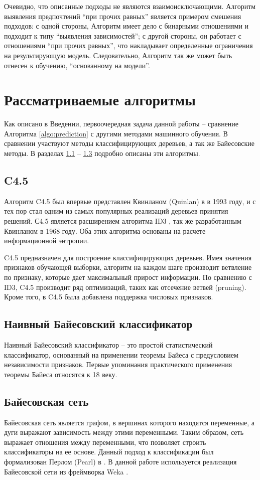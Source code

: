 	Очевидно, что описанные подходы не являются взаимоисключающими. Алгоритм выявления предпочтений \enquote{при прочих равных} является примером смешения подходов: с одной стороны, Алгоритм имеет дело с бинарными отношениями и подходит к типу ``выявления зависимостей''; с другой стороны, он работает с отношениями \enquote{при прочих равных}, что накладывает определенные ограничения на результирующую модель. Следовательно, Алгоритм так же может быть отнесен к обучению, ``основанному на модели''.

\section{Рассматриваемые алгоритмы}

	Как описано в Введении, первоочередная задача данной работы – сравнение Алгоритма \ref{algo:prediction} с другими методами машинного обучения. В сравнении участвуют методы классифицирующих деревьев, а так же Байесовские методы. В разделах \ref{subsec:c4.5} -- \ref{subsec:bayes_net} подробно описаны эти алгоритмы.
	
	\subsection{C4.5}
	\label{subsec:c4.5}
		Алгоритм C4.5 был впервые представлен Квинланом (Quinlan) в \cite{Quinlan:1993} в 1993 году, и с тех пор стал одним из самых популярных реализаций деревьев принятия решений. С4.5 является расширением алгоритма ID3 \cite{Quinlan:1986}, так же разработанным Квинланом в 1968 году. Оба этих алгоритма основаны на расчете информационной энтропии. 
		
		C4.5 предназначен для построение классифицирующих деревьев. Имея значения признаков обучающей выборки, алгоритм на каждом шаге производит ветвление по признаку, которые дает максимальный прирост информации. По сравнению с ID3, C4.5 производит ряд оптимизаций, таких как отсечение ветвей (pruning). Кроме того, в C4.5 была добавлена поддержка числовых признаков.
	
	\subsection{Наивный Байесовский классификатор}
	\label{subsec:naive_bayes}
		Наивный Байесовский классификатор – это простой статистический классификатор, основанный на применении теоремы Байеса с предусловием независимости признаков. Первые упоминания практического применения теоремы Байеса относятся к 18 веку. \cite{Stigler:1983}
	
	\subsection{Байесовская сеть}
	\label{subsec:bayes_net}
		Байесовская сеть является графом, в вершинах которого находятся переменные, а дуги выражают зависимость между этими переменными. Таким образом, сеть выражает отношения между переменными, что позволяет строить классификаторы на ее основе. Данный подход к классификации был формализован Перлом (Pearl) в \cite{Pearl:1985}. В данной работе используется реализация Байесовской сети из фреймворка Weka \cite[с.~111-123]{WekaManual}.